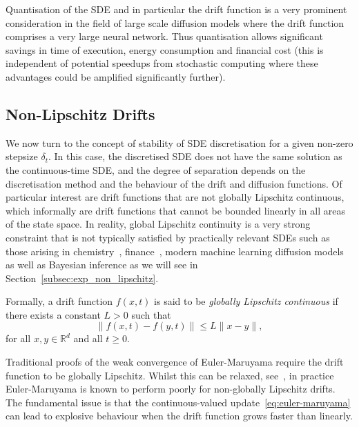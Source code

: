\documentclass[pra,showpacs,amsmath,amssymb,amsfonts,lengthcheck,longbibliography,onecolumn]{revtex4-2}
\newcommand{\pj}[1]{{\color[RGB]{200, 100, 0}{PJC: #1}}}
\begin{document}
Quantisation of the SDE and in particular the drift function is a very prominent consideration
in the field of large scale diffusion models where the drift function comprises a very large
neural network. Thus quantisation allows significant savings in time of execution,
energy consumption and financial cost \cite{li2023q} (this is independent of potential speedups
from stochastic computing where these advantages could be amplified significantly further).


\subsection{Non-Lipschitz Drifts}\label{subsec:non-lipshitz}


We now turn to the concept of stability of SDE discretisation for a given non-zero stepsize
$\delta_t$. In this case, the discretised SDE does not have the same solution as the continuous-time SDE,
and the degree of separation depends on the discretisation method and the behaviour of
the drift and diffusion functions. Of particular interest are drift functions that are not globally Lipschitz continuous,
which informally are drift functions that cannot be bounded linearly in all areas of the state space.
In reality, global Lipschitz continuity is a very strong constraint \cite{hutzenthaler2015numerical, mao2013strong} that is not typically satisfied
by practically relevant SDEs such as those arising in chemistry~\cite{gillespie2000chemical}, finance~\cite{higham2012convergence},
modern machine learning diffusion models~\cite{song2020score} as well as Bayesian inference
as we will see in Section~\ref{subsec:exp_non_lipschitz}.

Formally, a drift function $f(x,t)$ is said to be \textit{globally Lipschitz continuous} if there exists a constant $L > 0$ such that
\begin{equation}
    \|f(x,t) - f(y,t)\| \leq L\|x - y\|,
\end{equation}
for all $x, y \in \mathbb{R}^d$ and all $t \geq 0$. 

Traditional proofs of the weak convergence of Euler-Maruyama require the drift function to be globally Lipschitz.
Whilst this can be relaxed, see~\cite{higham2002strong}, in practice Euler-Maruyama is known to perform poorly
for non-globally Lipschitz drifts. The fundamental issue 
is that the continuous-valued update~\eqref{eq:euler-maruyama} can lead to explosive behaviour when the drift 
function grows faster than linearly.
\end{document}
